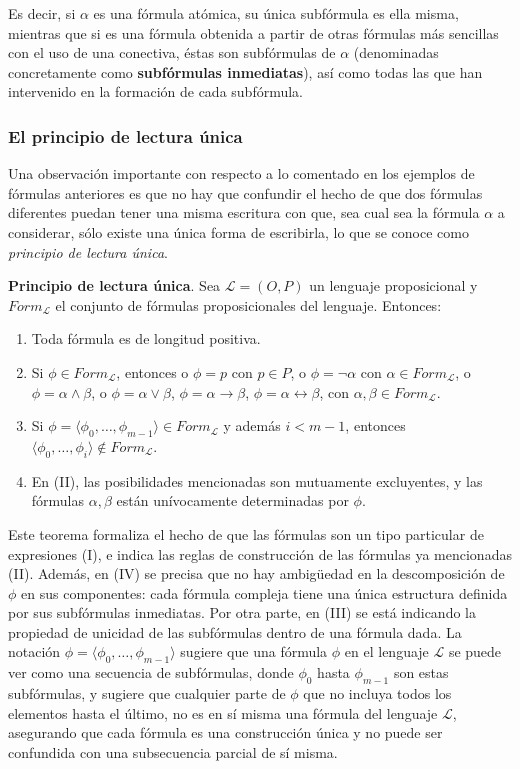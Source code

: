 Es decir, si $\alpha$ es una fórmula atómica, su única subfórmula es ella misma, mientras que si es una fórmula obtenida a partir de otras fórmulas más sencillas con el uso de una conectiva, éstas son subfórmulas de $\alpha$ (denominadas concretamente como \textbf{subfórmulas inmediatas}), así como todas las que han intervenido en la formación de cada subfórmula.

\subsubsection{El principio de lectura única}
Una observación importante con respecto a lo comentado en los ejemplos de fórmulas anteriores es que no hay que confundir el hecho de que dos fórmulas diferentes puedan tener una misma escritura con que, sea cual sea la fórmula $\alpha$ a considerar, sólo existe una única forma de escribirla, lo que se conoce como \textit{principio de lectura única}.

\begin{teorema}
    \textbf{Principio de lectura única}. Sea $\mathcal{L} = (O,P)$ un lenguaje proposicional y $Form_{\mathcal{L}}$ el conjunto de fórmulas proposicionales del lenguaje. Entonces:
    \begin{enumerate}[label=\Roman*.]
        \item Toda fórmula es de longitud positiva.
        \item Si $\phi \in Form_{\mathcal{L}}$, entonces o $\phi = p$ con $p \in P$, o $\phi = \neg \alpha$ con $\alpha \in Form_{\mathcal{L}}$, o $\phi = \alpha \land \beta$, o $\phi = \alpha \lor \beta$, $\phi = \alpha \rightarrow \beta$, $\phi = \alpha \leftrightarrow \beta$, con $\alpha,\beta \in Form_{\mathcal{L}}$.
        \item Si $\phi = \langle \phi_0,\ldots,\phi_{m-1} \rangle \in Form_{\mathcal{L}}$ y además $i < m-1$, entonces $\langle \phi_0,\ldots,\phi_{i} \rangle \not \in Form_{\mathcal{L}}$.
        \item En (II), las posibilidades mencionadas son mutuamente excluyentes, y las fórmulas $\alpha,\beta$ están unívocamente determinadas por $\phi$.
    \end{enumerate}
\end{teorema}

Este teorema formaliza el hecho de que las fórmulas son un tipo particular de expresiones (I), e indica las reglas de construcción de las fórmulas ya mencionadas (II). Además, en (IV) se precisa que no hay ambigüedad en la descomposición de $\phi$ en sus componentes: cada fórmula compleja tiene una única estructura definida por sus subfórmulas inmediatas. Por otra parte, en (III) se está indicando la propiedad de unicidad de las subfórmulas dentro de una fórmula dada. La notación $\phi = \langle \phi_0,\ldots,\phi_{m-1} \rangle$ sugiere que una fórmula $\phi$ en el lenguaje $\mathcal{L}$ se puede ver como una secuencia de subfórmulas, donde $\phi_0$ hasta $\phi_{m-1}$ son estas subfórmulas, y sugiere que cualquier parte de $\phi$ que no incluya todos los elementos hasta el último, no es en sí misma una fórmula del lenguaje $\mathcal{L}$, asegurando que cada fórmula es una construcción única y no puede ser confundida con una subsecuencia parcial de sí misma.

